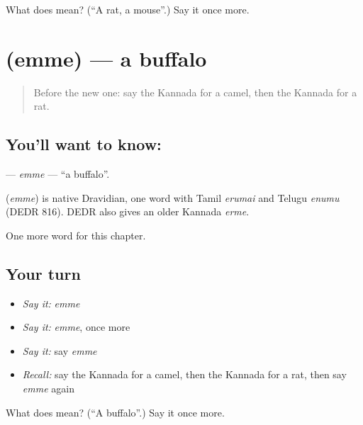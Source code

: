 \begin{tcolorbox}[breakable,colback=teal!4,colframe=teal!35!black,title={Before you move on}]
What does  mean? (\textquotedblleft{}A rat, a mouse\textquotedblright{}.) Say it once more.
\end{tcolorbox}
\section[\texorpdfstring{\kn{ಎಮ್ಮೆ} (emme)}{ಎಮ್ಮೆ (emme)}]{ (emme) — a buffalo}

\label{lesson:KA-C134-emme}



\begin{quote}
Before the new one: say the Kannada for a camel, then the Kannada for a rat.
\end{quote}

\subsection*{You'll want to know: }
\textbf{} — \emph{emme} — \textquotedblleft{}a buffalo\textquotedblright{}.

\begin{cousinweb}
\textbf{} (\emph{emme}) is native Dravidian, one word with Tamil \emph{erumai} and Telugu \emph{enumu} (DEDR 816). DEDR also gives an older Kannada \emph{erme}.
\end{cousinweb}

\begin{grammarlens}[title={What you've built}]
One more word for this chapter.
\end{grammarlens}

\subsection*{Your turn}
\begin{itemize}
\raggedright
  \item \emph{Say it:} \emph{emme}
  \item \emph{Say it:} \emph{emme}, once more
  \item \emph{Say it:} say \emph{emme}
  \item \emph{Recall:} say the Kannada for a camel, then the Kannada for a rat, then say \emph{emme} again
\end{itemize}

\begin{tcolorbox}[breakable,colback=teal!4,colframe=teal!35!black,title={Before you move on}]
What does  mean? (\textquotedblleft{}A buffalo\textquotedblright{}.) Say it once more.
\end{tcolorbox}
